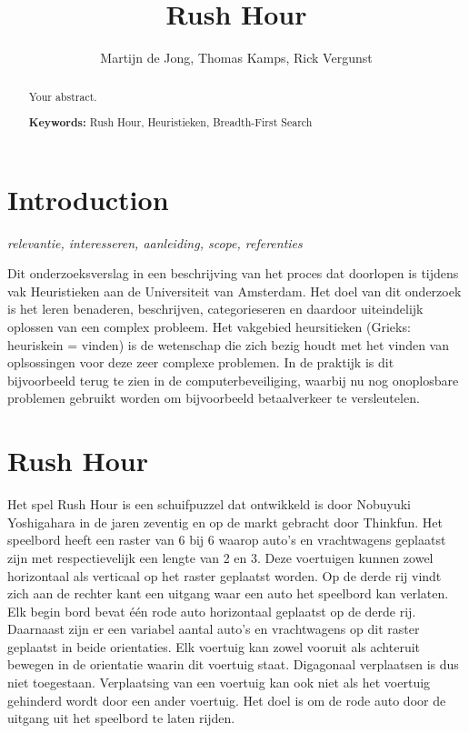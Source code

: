 \documentclass[a4paper]{article}
\title{Rush Hour}
\author{Martijn de Jong, Thomas Kamps, Rick Vergunst}
\begin{document}
\maketitle

\begin{abstract}
Your abstract.

\vspace{5mm}
\textbf{Keywords:} Rush Hour, Heuristieken, Breadth-First Search
\end{abstract}

\section{Introduction}
\textit{relevantie, interesseren, aanleiding, scope, referenties}

Dit onderzoeksverslag in een beschrijving van het proces dat doorlopen is tijdens vak Heuristieken aan de Universiteit van Amsterdam. Het doel van dit onderzoek is het leren benaderen, beschrijven, categorieseren en daardoor uiteindelijk oplossen van een complex probleem. Het vakgebied heursitieken (Grieks: heuriskein = vinden) is de wetenschap die zich bezig houdt met het vinden van oplsossingen voor deze zeer complexe problemen. In de praktijk is dit bijvoorbeeld terug te zien in de computerbeveiliging, waarbij nu nog onoplosbare problemen gebruikt worden om bijvoorbeeld betaalverkeer te versleutelen.

\section{Rush Hour}
Het spel Rush Hour is een schuifpuzzel dat ontwikkeld is door Nobuyuki Yoshigahara in de jaren zeventig en op de markt gebracht door Thinkfun. Het speelbord heeft een raster van 6 bij 6 waarop auto's en vrachtwagens geplaatst zijn met respectievelijk een lengte van 2 en 3. Deze voertuigen kunnen zowel horizontaal als verticaal op het raster geplaatst worden. Op de derde rij vindt zich aan de rechter kant een uitgang waar een auto het speelbord kan verlaten. Elk begin bord bevat één rode auto horizontaal geplaatst op de derde rij. Daarnaast zijn er een variabel aantal auto's en vrachtwagens op dit raster geplaatst in beide orientaties. Elk voertuig kan zowel vooruit als achteruit bewegen in de orientatie waarin dit voertuig staat. Digagonaal verplaatsen is dus niet toegestaan. Verplaatsing van een voertuig kan ook niet als het voertuig gehinderd wordt door een ander voertuig. Het doel is om de rode auto door de uitgang uit het speelbord te laten rijden. 
\end{document}
